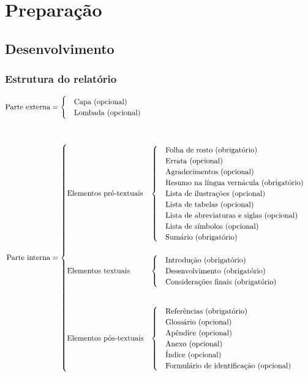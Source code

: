\documentclass{Arquivos/AcademicoPadrao}
\begin{document}
\Sumario


\textual %




\part{Preparação} %
\chapter{Desenvolvimento}
\section{Estrutura do relatório}

{\SingleSpacing
\[
\begin{aligned}
\text{Parte externa} &=
\begin{cases}
\quad\text{Capa (opcional)}\\
\quad\text{Lombada (opcional)}
\end{cases}
\\[3em]
\text{Parte interna} &=
\begin{cases}
\text{Elementos pré-textuais} &
\begin{cases}
\quad\text{Folha de rosto (obrigatório)}\\
\quad\text{Errata (opcional)}\\
\quad\text{Agradecimentos (opcional)}\\
\quad\text{Resumo na língua vernácula (obrigatório)}\\
\quad\text{Lista de ilustrações (opcional)}\\
\quad\text{Lista de tabelas (opcional)}\\
\quad\text{Lista de abreviaturas e siglas (opcional)}\\
\quad\text{Lista de símbolos (opcional)}\\
\quad\text{Sumário (obrigatório)}
\end{cases}
\\\rule{0pt}{4em}
\text{Elementos textuais} &
\begin{cases}
\quad\text{Introdução (obrigatório)}\\
\quad\text{Desenvolvimento (obrigatório)}\\
\quad\text{Considerações finais (obrigatório)}
\end{cases}
\\\rule{0pt}{7em}
\text{Elementos pós-textuais} &
\begin{cases}
\quad\text{Referências (obrigatório)}\\
\quad\text{Glossário (opcional)}\\
\quad\text{Apêndice (opcional)}\\
\quad\text{Anexo (opcional)}\\
\quad\text{Índice (opcional)}\\
\quad\text{Formulário de identificação (opcional)}
\end{cases}
\end{cases}
\end{aligned}
\]}
\end{document}
